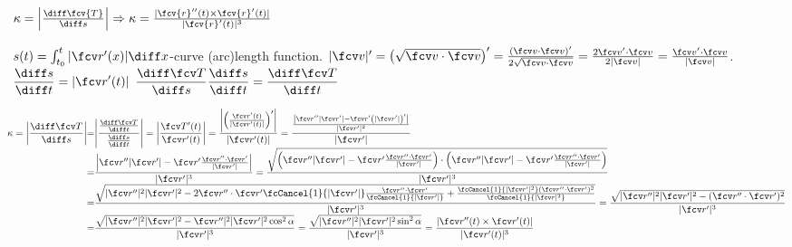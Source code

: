 
\begin{frame}
\frametitle {$\kappa  = \left| \frac{\diff \fcv{T}}{\diff s}\right|\Rightarrow \kappa=\frac{|\fcv{r}''(t) \times \fcv{r}'(t)|}{|\fcv{r}'(t)|^3}$}
$s(t)=\int_{t_0}^t |\fcv r'(x)|\diff x$-curve (arc)length function. $|\fcv v|'=\left(\sqrt{\fcv v\cdot \fcv v}\right)'=\frac{(\fcv v \cdot \fcv v)'}{2\sqrt{\fcv v\cdot \fcv v}}=\frac{2\fcv v'\cdot \fcv v}{2|\fcv v|}=\frac{\fcv v'\cdot \fcv v}{|\fcv v|}$. $ \displaystyle\frac{\diff s}{\diff t}=\displaystyle |\fcv r'(t)|$ $
\displaystyle \frac{\diff \fcv T}{\diff s} \frac{\diff s}{\diff t}=\displaystyle \frac{\diff \fcv T}{\diff t}$

$
\!\!\!\!
\begin{array}{@{}r@{}c@{}l}
\displaystyle \kappa=\left|\frac{\diff \fcv T}{\diff s}\right|&=&\displaystyle \left| \frac{\frac{\diff \fcv T}{\diff t}}{\frac{\diff s}{\diff t}}\right| =\left|\frac{\fcv T'(t)}{\fcv r'(t)}\right|=\frac{\left| \left(\frac{\fcv r'(t)}{|\fcv r'(t)|} \right)' \right| }{ |\fcv r'(t)| }
=\displaystyle \frac{ \frac{\left| \fcv r'' |\fcv r'|- \fcv r' \left(|\fcv r'|\right)' \right|}{|\fcv r'|^2}  }{|\fcv r'|}\\
&=&\displaystyle \frac{\left| \fcv r '' |\fcv r'| - \fcv r' \frac{\fcv r''\cdot \fcv r'}{|\fcv r'|} \right|}{|\fcv r'|^3} =\displaystyle \frac{\sqrt{\left( \fcv r '' |\fcv r'| - \fcv r' \frac{\fcv r''\cdot \fcv r'}{|\fcv r'|}\right)\cdot \left( \fcv r '' |\fcv r'| - \fcv r' \frac{\fcv r''\cdot \fcv r'}{|\fcv r'|}\right)} }{|\fcv r'|^3}\\
&=&\displaystyle \frac{\sqrt{|\fcv r''|^2|\fcv r'|^2-2\fcv r''\cdot \fcv r' \fcCancel{1}{|\fcv r'|} \frac{\fcv r''\cdot \fcv r'}{\fcCancel{1}{ |\fcv r' |}} + \frac{\fcCancel{1}{|\fcv r'|^2} (\fcv r''\cdot\fcv r')^2}{\fcCancel{1}{ |\fcv r|^2} } }}{|\fcv r'|^3}=\frac{\sqrt{|\fcv r''|^2|\fcv r'|^2-(\fcv r''\cdot \fcv r')^2  }}{|\fcv r'|^3}\\
&=&\displaystyle \frac{\sqrt{|\fcv r''|^2|\fcv r'|^2- \fcv r''|^2|\fcv r'|^2\cos^2 \alpha }}{|\fcv r'|^3}=\frac{\sqrt{|\fcv r''|^2|\fcv r'|^2\sin^2 \alpha }}{|\fcv r'|^3}=\frac{|\fcv r''(t)\times \fcv r'(t)|}{|\fcv r'(t)|^3}
\end{array}
$
\end{frame}